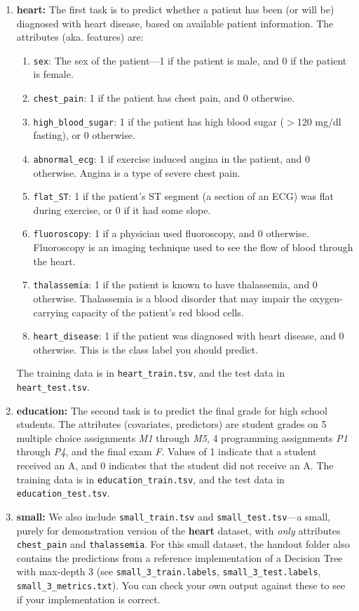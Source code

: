 \documentclass[11pt,addpoints,answers]{exam}
\begin{document}
\begin{enumerate}
\item \textbf{heart:}
    The first task is to predict whether a patient has been (or will be) diagnosed with heart disease, based on available patient information. The attributes (aka. features) are: 
    \begin{enumerate}
        \item \lstinline{sex}: The sex of the patient---1 if the patient is male, and 0 if the patient is female.
        \item \lstinline{chest_pain}: 1 if the patient has chest pain, and 0 otherwise.
        \item \lstinline{high_blood_sugar}: 1 if the patient has high blood sugar ($>$120 mg/dl fasting), or 0 otherwise.
        \item \lstinline{abnormal_ecg}: 1 if exercise induced angina in the patient, and 0 otherwise. Angina is a type of severe chest pain.
        \item \lstinline{flat_ST}: 1 if the patient's ST segment (a section of an ECG) was flat during exercise, or 0 if it had some slope.
        \item \lstinline{fluoroscopy}: 1 if a physician used fluoroscopy, and 0 otherwise. Fluoroscopy is an imaging technique used to see the flow of blood through the heart.
        \item \lstinline{thalassemia}: 1 if the patient is known to have thalassemia, and 0 otherwise. Thalassemia is a blood disorder that may impair the oxygen-carrying capacity of the patient's red blood cells.
        \item \lstinline{heart_disease}: 1 if the patient was diagnosed with heart disease, and 0 otherwise. This is the class label you should predict.
    \end{enumerate}
    The training data is in \lstinline{heart_train.tsv}, and the test data in \lstinline{heart_test.tsv}.
\item \textbf{education:}
    The second task is to predict the final grade for high school students. The attributes (covariates, predictors) are student grades on 5 multiple choice assignments \emph{M1} through \emph{M5}, 4 programming assignments \emph{P1} through \emph{P4}, and the final exam \emph{F}. Values of 1 indicate that a student received an A, and 0 indicates that the student did not receive an A. The training data is in \newline \lstinline{education_train.tsv}, and the test data in \lstinline{education_test.tsv}.
\item \textbf{small:}
    We also include \lstinline{small_train.tsv} and \lstinline{small_test.tsv}---a small, purely for demonstration version of the \textbf{heart} dataset, with \emph{only} attributes \lstinline{chest_pain} and \lstinline{thalassemia}.  
    For this small dataset, the handout folder also contains the predictions from a reference implementation of a Decision Tree with max-depth 3 (see \lstinline{small_3_train.labels}, \lstinline{small_3_test.labels}, \lstinline{small_3_metrics.txt}).
    You can check your own output against these to see if your implementation is correct.
\end{enumerate}
\end{document}

